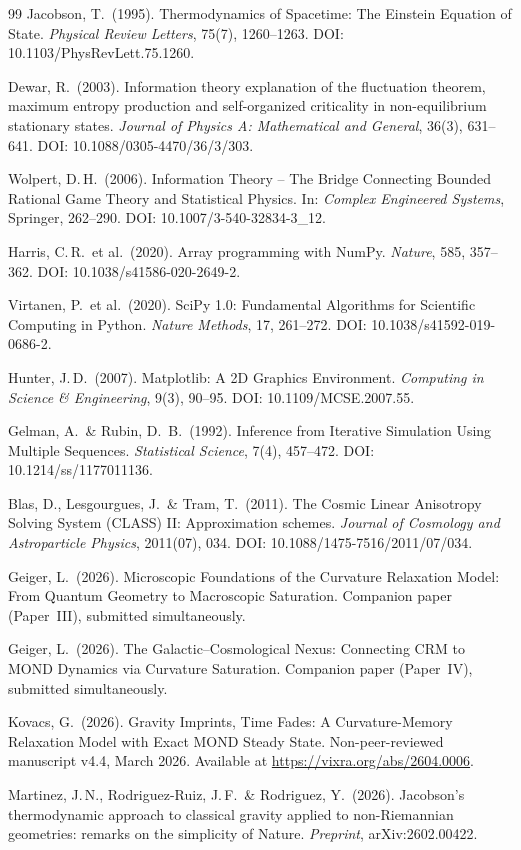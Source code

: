 \documentclass[aps,prd,twocolumn,superscriptaddress,nofootinbib]{revtex4-2}
\begin{document}
\begin{thebibliography}{99}
Jacobson, T.\ (1995).
Thermodynamics of Spacetime: The Einstein Equation of State.
\textit{Physical Review Letters}, 75(7), 1260--1263.
DOI: 10.1103/PhysRevLett.75.1260.

Dewar, R.\ (2003).
Information theory explanation of the fluctuation theorem, maximum entropy production and self-organized criticality in non-equilibrium stationary states.
\textit{Journal of Physics A: Mathematical and General}, 36(3), 631--641.
DOI: 10.1088/0305-4470/36/3/303.

Wolpert, D.\,H.\ (2006).
Information Theory -- The Bridge Connecting Bounded Rational Game Theory and Statistical Physics.
In: \textit{Complex Engineered Systems}, Springer, 262--290.
DOI: 10.1007/3-540-32834-3\_12.

Harris, C.\,R.\ et al.\ (2020).
Array programming with NumPy.
\textit{Nature}, 585, 357--362.
DOI: 10.1038/s41586-020-2649-2.

Virtanen, P.\ et al.\ (2020).
SciPy 1.0: Fundamental Algorithms for Scientific Computing in Python.
\textit{Nature Methods}, 17, 261--272.
DOI: 10.1038/s41592-019-0686-2.

Hunter, J.\,D.\ (2007).
Matplotlib: A 2D Graphics Environment.
\textit{Computing in Science \& Engineering}, 9(3), 90--95.
DOI: 10.1109/MCSE.2007.55.

Gelman, A.\ \& Rubin, D.~B.\ (1992).
Inference from Iterative Simulation Using Multiple Sequences.
\textit{Statistical Science}, 7(4), 457--472.
DOI: 10.1214/ss/1177011136.

Blas, D., Lesgourgues, J.\ \& Tram, T.\ (2011).
The Cosmic Linear Anisotropy Solving System (CLASS) II: Approximation schemes.
\textit{Journal of Cosmology and Astroparticle Physics}, 2011(07), 034.
DOI: 10.1088/1475-7516/2011/07/034.

Geiger, L.\ (2026).
Microscopic Foundations of the Curvature Relaxation Model: From Quantum Geometry to Macroscopic Saturation.
Companion paper (Paper~III), submitted simultaneously.

Geiger, L.\ (2026).
The Galactic--Cosmological Nexus: Connecting CRM to MOND Dynamics via Curvature Saturation.
Companion paper (Paper~IV), submitted simultaneously.

Kovacs, G.\ (2026).
Gravity Imprints, Time Fades: A Curvature-Memory Relaxation Model with Exact MOND Steady State.
Non-peer-reviewed manuscript v4.4, March 2026.
Available at \url{https://vixra.org/abs/2604.0006}.

Martinez, J.\,N., Rodriguez-Ruiz, J.\,F.\ \& Rodriguez, Y.\ (2026).
Jacobson's thermodynamic approach to classical gravity applied to non-Riemannian geometries: remarks on the simplicity of Nature.
\textit{Preprint}, arXiv:2602.00422.

\end{thebibliography}
\end{document}
